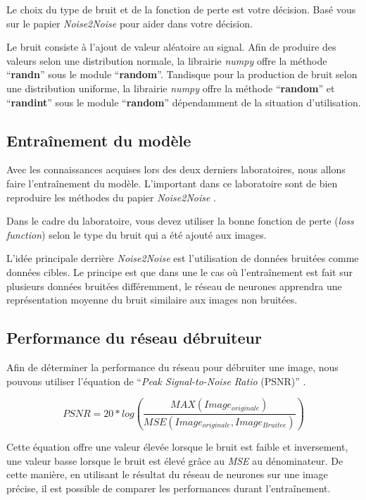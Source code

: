 \documentclass{article}
\begin{document}
\bigbreak
Le choix du type de bruit et de la fonction de perte est votre décision. Basé vous sur le papier \textit{Noise2Noise} \citep{Noise2Noise} pour aider dans votre décision.

\bigbreak
Le bruit consiste à l'ajout de valeur aléatoire au signal. Afin de produire des valeurs selon une distribution normale, la librairie \textit{numpy} offre la méthode ``\textbf{randn}'' sous le module ``\textbf{random}''. Tandisque pour la production de bruit selon une distribution uniforme, la librairie \textit{numpy} offre la méthode ``\textbf{random}'' et ``\textbf{randint}'' sous le module ``\textbf{random}'' dépendamment de la situation d'utilisation.

\subsection{Entraînement du modèle}
Avec les connaissances acquises lors des deux derniers laboratoires, nous allons faire l'entraînement du modèle. L'important dans ce laboratoire sont de bien reproduire les méthodes du papier \textit{Noise2Noise} \citep{Noise2Noise}.

\bigbreak
Dans le cadre du laboratoire, vous devez utiliser la bonne fonction de perte (\textit{loss function}) selon le type du bruit qui a été ajouté aux images.

\bigbreak
L'idée principale derrière \textit{Noise2Noise} est l'utilisation de données bruitées comme données cibles. Le principe est que dans une le cas où l'entraînement est fait sur plusieurs données bruitées différemment, le réseau de neurones apprendra une représentation moyenne du bruit similaire aux images non bruitées.

\subsection{Performance du réseau débruiteur}
Afin de déterminer la performance du réseau pour débruiter une image, nous pouvons utiliser l'équation de ``\textit{Peak Signal-to-Noise Ratio} (PSNR)'' \citep{PSNRWiki}.

$$PSNR = 20 * log(\frac{MAX(Image_{originale})}{MSE(Image_{originale},Image_{Bruitee})})$$

\bigbreak
Cette équation offre une valeur élevée lorsque le bruit est faible et inversement, une valeur basse lorsque le bruit est élevé grâce au \textit{MSE} au dénominateur. De cette manière, en utilisant le résultat du réseau de neurones sur une image précise, il est possible de comparer les performances durant l'entraînement.
\end{document}
